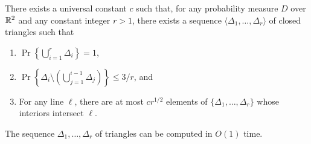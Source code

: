 \documentclass{patmorin}
\begin{document}
\begin{thm}
There exists a universal
constant $c$ such that, for any probability measure $D$ over $\mathbb{R}^2$ and any constant integer $r>1$, there exists a sequence
$\langle \Delta_1,\ldots,\Delta_r\rangle$ of closed triangles such that
  \begin{enumerate}
    \item $\Pr\left\{\bigcup_{i=1}^r \Delta_i\right\} = 1$,
  
    \item $\Pr\left\{\Delta_i \setminus
    \left(\bigcup_{j=1}^{i-1}\Delta_j\right)\right\} \le 3/r$, and
  
    \item For any line $\ell$, there are at most $cr^{1/2}$ elements of
    $\{\Delta_1,\ldots,\Delta_r\}$ whose interiors intersect $\ell$.
  \end{enumerate}
  The sequence $\Delta_1,\ldots,\Delta_r$ of triangles can be computed
  in $O(1)$ time.
\end{thm}

\def\isdef{\buildrel {\rm def} \over =}
\def\PROB{\Pr}
\end{document}
